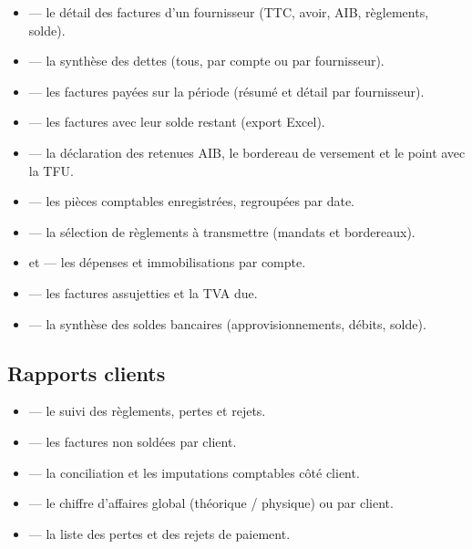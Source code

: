 \begin{itemize}
  \item {} — le détail des factures d'un fournisseur (TTC, avoir, AIB, règlements, solde).
  \item {} — la synthèse des dettes (tous, par compte ou par fournisseur).
  \item {} — les factures payées sur la période (résumé et détail par fournisseur).
  \item {} — les factures avec leur solde restant (export Excel).
  \item {} — la déclaration des retenues AIB, le bordereau de versement et le point avec la TFU.
  \item {} — les pièces comptables enregistrées, regroupées par date.
  \item {} — la sélection de règlements à transmettre (mandats et bordereaux).
  \item {} et  — les dépenses et immobilisations par compte.
  \item {} — les factures assujetties et la TVA due.
  \item {} — la synthèse des soldes bancaires (approvisionnements, débits, solde).
\end{itemize}

\subsection{Rapports clients}

\begin{itemize}
  \item {} — le suivi des règlements, pertes et rejets.
  \item {} — les factures non soldées par client.
  \item {} — la conciliation et les imputations comptables côté client.
  \item {} — le chiffre d'affaires global (théorique / physique) ou par client.
  \item {} — la liste des pertes et des rejets de paiement.
\end{itemize}

